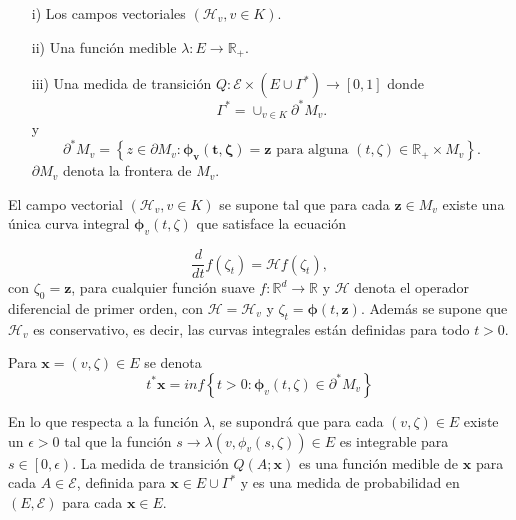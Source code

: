 \documentclass{article}
\newcommand{\rea}{\mathbb{R}}
\begin{document}
\begin{itemize}
\item[i)] Los campos vectoriales $\left(\mathcal{H}_{v},v\in
K\right)$. \item[ii)] Una funci\'on medible $\lambda:E\rightarrow
\rea_{+}$. \item[iii)] Una medida de transici\'on
$Q:\mathcal{E}\times\left(E\cup\Gamma^{*}\right)\rightarrow\left[0,1\right]$
donde
\begin{equation}
\Gamma^{*}=\cup_{v\in K}\partial^{*}M_{v}.
\end{equation}
y
\begin{equation}
\partial^{*}M_{v}=\left\{z\in\partial M_{v}:\mathbf{\mathbf{\phi}_{v}\left(t,\zeta\right)=\mathbf{z}}\textrm{ para alguna }\left(t,\zeta\right)\in\rea_{+}\times M_{v}\right\}.
\end{equation}
$\partial M_{v}$ denota  la frontera de $M_{v}$.
\end{itemize}

El campo vectorial $\left(\mathcal{H}_{v},v\in K\right)$ se supone
tal que para cada $\mathbf{z}\in M_{v}$ existe una \'unica curva
integral $\mathbf{\phi}_{v}\left(t,\zeta\right)$ que satisface la
ecuaci\'on

\begin{equation}
\frac{d}{dt}f\left(\zeta_{t}\right)=\mathcal{H}f\left(\zeta_{t}\right),
\end{equation}
con $\zeta_{0}=\mathbf{z}$, para cualquier funci\'on suave
$f:\rea^{d}\rightarrow\rea$ y $\mathcal{H}$ denota el operador
diferencial de primer orden, con $\mathcal{H}=\mathcal{H}_{v}$ y
$\zeta_{t}=\mathbf{\phi}\left(t,\mathbf{z}\right)$. Adem\'as se
supone que $\mathcal{H}_{v}$ es conservativo, es decir, las curvas
integrales est\'an definidas para todo $t>0$.

Para $\mathbf{x}=\left(v,\zeta\right)\in E$ se denota
\[t^{*}\mathbf{x}=inf\left\{t>0:\mathbf{\phi}_{v}\left(t,\zeta\right)\in\partial^{*}M_{v}\right\}\]

En lo que respecta a la funci\'on $\lambda$, se supondr\'a que
para cada $\left(v,\zeta\right)\in E$ existe un $\epsilon>0$ tal
que la funci\'on
$s\rightarrow\lambda\left(v,\phi_{v}\left(s,\zeta\right)\right)\in
E$ es integrable para $s\in\left[0,\epsilon\right)$. La medida de
transici\'on $Q\left(A;\mathbf{x}\right)$ es una funci\'on medible
de $\mathbf{x}$ para cada $A\in\mathcal{E}$, definida para
$\mathbf{x}\in E\cup\Gamma^{*}$ y es una medida de probabilidad en
$\left(E,\mathcal{E}\right)$ para cada $\mathbf{x}\in E$.
\end{document}
